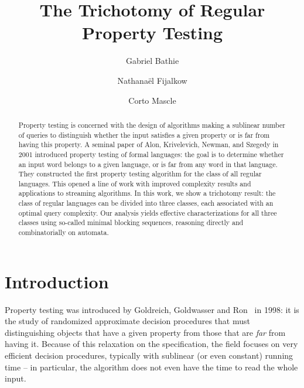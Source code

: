 \documentclass[letterpaper, USenglish, cleveref, autoref, thm-restate, numberwithinsect]{lipics-v2021}
\title{The Trichotomy of Regular Property Testing}
\author{Gabriel {Bathie}}{LaBRI, Université de Bordeaux \and DIENS, Paris, France \and \url{https://perso.ens-lyon.fr/gabriel.bathie}}{gabriel.bathie@labri.fr}{}{Partially funded by the grant ANR-20-CE48-0001 from the French National Research Agency.}
\author{Nathanaël Fijalkow}{LaBRI, CNRS, Université de Bordeaux, France \and \url{https://games-automata-play.com/}}{nathanael.fijalkow@gmail.com}{}{}
\author{Corto Mascle}{LaBRI, Université de Bordeaux, France \and MPI-SWS, Kaiserslautern, Germany \and \url{https://corto-mascle.github.io/}}{corto.mascle@labri.fr}{}{}
\theoremstyle{theorem}
\theoremstyle{definition}
\begin{document}
	
	
\maketitle
\begin{abstract}
Property testing is concerned with the design of algorithms making a sublinear number of queries to distinguish whether the input satisfies a given property or is far from having this property. A seminal paper of Alon, Krivelevich, Newman, and Szegedy in 2001 introduced property testing of formal languages: the goal is to determine whether an input word belongs to a given language, or is far from any word in that language. They constructed the first property testing algorithm for the class of all regular languages. This opened a line of work with improved complexity results and applications to streaming algorithms. In this work, we show a trichotomy result: the class of regular languages can be divided into three classes, each associated with an optimal query complexity. 
Our analysis yields effective characterizations for all three classes using so-called minimal blocking sequences, reasoning directly and combinatorially on automata.

 \end{abstract}

\section{Introduction}
Property testing was introduced by Goldreich, Goldwasser and Ron~\cite{goldreich1998property} in 1998: it is the study of randomized approximate decision procedures that must distinguishing objects that have a given property from those that are \emph{far} from having it. 
Because of this relaxation on the specification, the field focuses on very efficient decision procedures, typically with sublinear (or even constant) running time -- in particular, the algorithm does not even have the time to read the whole input.
\end{document}
